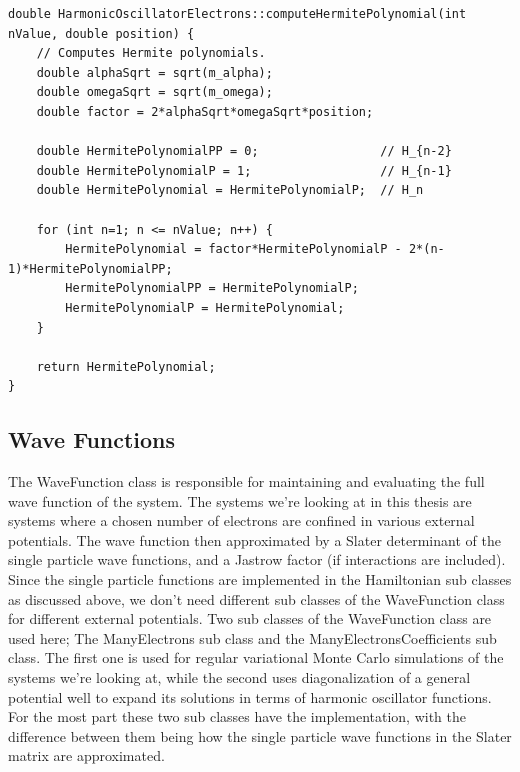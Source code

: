 \documentclass[../main.tex]{subfiles}
\begin{document}
\lstset{language=c++}
\begin{lstlisting}[caption={Recursive method for computing Hermite polynomials. This method requires the least amount of code and will work for any amount of particles in the system. However, it is also the least optimized method in terms of computation time, and it can be very time consuming when the amount of particles is high.}]
double HarmonicOscillatorElectrons::computeHermitePolynomial(int nValue, double position) {
    // Computes Hermite polynomials.
    double alphaSqrt = sqrt(m_alpha);
    double omegaSqrt = sqrt(m_omega);
    double factor = 2*alphaSqrt*omegaSqrt*position;

    double HermitePolynomialPP = 0;                 // H_{n-2}
    double HermitePolynomialP = 1;                  // H_{n-1}
    double HermitePolynomial = HermitePolynomialP;  // H_n

    for (int n=1; n <= nValue; n++) {
        HermitePolynomial = factor*HermitePolynomialP - 2*(n-1)*HermitePolynomialPP;
        HermitePolynomialPP = HermitePolynomialP;
        HermitePolynomialP = HermitePolynomial;
    }

    return HermitePolynomial;
}
\end{lstlisting}

\subsection{Wave Functions}

The WaveFunction class is responsible for maintaining and evaluating the full wave function of the system. The systems we're looking at in this thesis are systems where a chosen number of electrons are confined in various external potentials. The wave function then approximated by a Slater determinant of the single particle wave functions, and a Jastrow factor (if interactions are included). Since the single particle functions are implemented in the Hamiltonian sub classes as discussed above, we don't need different sub classes of the WaveFunction class for different external potentials. Two sub classes of the WaveFunction class are used here; The ManyElectrons sub class and the ManyElectronsCoefficients sub class. The first one is used for regular variational Monte Carlo simulations of the systems we're looking at, while the second uses diagonalization of a general potential well to expand its solutions in terms of harmonic oscillator functions. For the most part these two sub classes have the implementation, with the difference between them being how the single particle wave functions in the Slater matrix are approximated.
\end{document}
